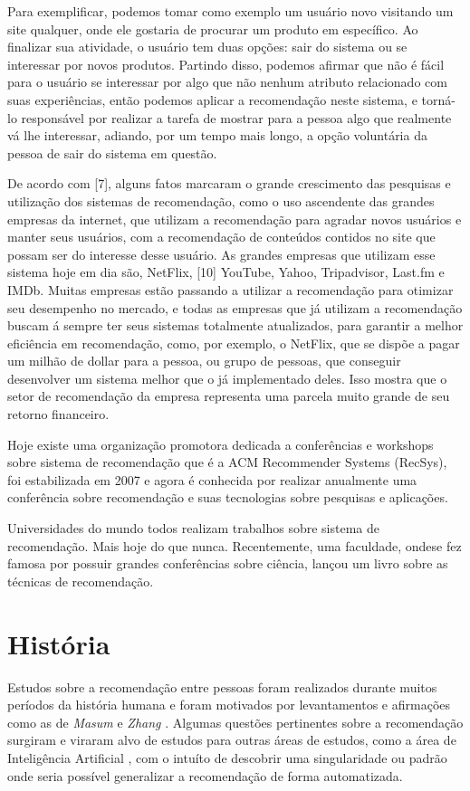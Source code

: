 \documentclass[12pt,
				openright,
				twoside,
				a4paper,
				apter=TITLE,
				section=TITLE,
				subsection=TITLE,
				chapter=TITLE,
				english,
				brazil]{abntex2}
\begin{document}
Para exemplificar, podemos tomar como exemplo um usuário novo visitando um site qualquer, onde ele gostaria de procurar um produto em específico. Ao finalizar sua atividade, o usuário tem duas opções: sair do sistema ou se interessar por novos produtos. Partindo disso, podemos afirmar que não é fácil para o usuário se interessar por algo que não nenhum atributo relacionado com suas experiências, então podemos aplicar a recomendação neste sistema, e torná-lo responsável por realizar a tarefa de mostrar para a pessoa algo que realmente vá lhe interessar, adiando, por um tempo mais longo, a opção voluntária da pessoa de sair do sistema em questão.

De acordo com [7], alguns fatos marcaram o grande crescimento das pesquisas e utilização dos sistemas de recomendação, como o uso ascendente das grandes empresas da internet, que utilizam a recomendação para agradar novos usuários e manter seus usuários, com a recomendação de conteúdos contidos no site que possam ser do interesse desse usuário. As grandes empresas que utilizam esse sistema hoje em dia são, NetFlix, [10] YouTube, Yahoo, Tripadvisor, Last.fm e IMDb. Muitas empresas estão passando a utilizar a recomendação para otimizar seu desempenho no mercado, e todas as empresas que já utilizam a recomendação buscam á sempre ter seus sistemas totalmente atualizados, para garantir a melhor eficiência em recomendação, como, por exemplo, o NetFlix, que se dispõe a pagar um milhão de dollar para a pessoa, ou grupo de pessoas, que conseguir desenvolver um sistema melhor que o já implementado deles. Isso mostra que o setor de recomendação da empresa representa uma parcela muito grande de seu retorno financeiro. 

Hoje existe uma organização promotora dedicada a conferências e workshops sobre sistema de recomendação que é a ACM Recommender Systems (RecSys), foi estabilizada em 2007 e agora é conhecida por realizar anualmente uma conferência sobre recomendação e suas tecnologias sobre pesquisas e aplicações.

Universidades do mundo todos realizam trabalhos sobre sistema de recomendação. Mais hoje do que nunca. Recentemente, uma faculdade, ondese fez famosa por possuir grandes conferências sobre ciência, lançou um livro sobre as técnicas de recomendação.


\section{História}
Estudos sobre a recomendação entre pessoas foram realizados durante muitos períodos da história humana e foram motivados por levantamentos e afirmações como as de \textit{Masum} e \textit{Zhang} \cite{masum2004manifesto}. Algumas questões pertinentes sobre a recomendação surgiram e viraram alvo de estudos para outras áreas de estudos, como a área de Inteligência Artificial \cite{ramos2008ambient}, com o intuíto de descobrir uma singularidade ou padrão onde seria possível generalizar a recomendação de forma automatizada.
\end{document}
